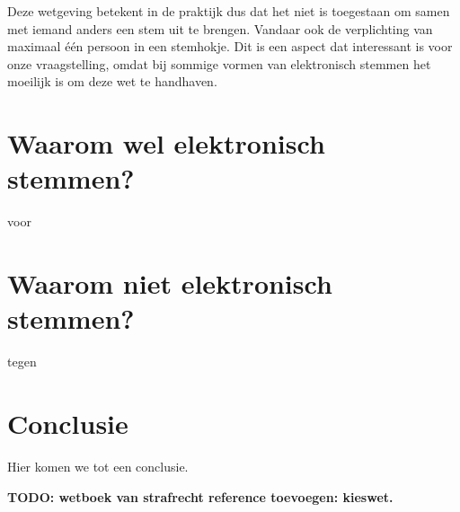 \documentclass[a4paper]{article}
\newcommand{\TODO}[1]{{\color{red}\textbf{TODO: #1}}}
\begin{document}
Deze wetgeving betekent in de praktijk dus dat het niet is toegestaan om samen met iemand anders een stem uit te brengen.
Vandaar ook de verplichting van maximaal één persoon in een stemhokje.
Dit is een aspect dat interessant is voor onze vraagstelling, omdat bij sommige vormen van elektronisch stemmen het moeilijk is om deze wet te handhaven.

\section{Waarom wel elektronisch stemmen?}

voor

\section{Waarom niet elektronisch stemmen?}

tegen


\section{Conclusie}

Hier komen we tot een conclusie.

\newpage

\TODO{wetboek van strafrecht reference toevoegen: kieswet.}


\renewcommand\refname{Literatuur}

\end{document}
